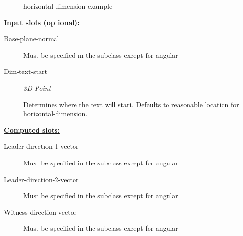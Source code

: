 \documentclass [11pt]{book}
\begin{document}
\begin{itemize}
\begin{figure}
\caption{horizontal-dimension example}

\label{fig:horizontal-dimension}

\end{figure}





\textbf{
\underline{Input slots (optional):}}

\begin{description}

\item [Base-plane-normal]

Must be specified in the subclass except for angular




\item [Dim-text-start]
\emph{3D Point}

 Determines where the text will start. Defaults to reasonable location for
horizontal-dimension.




\end{description}






\textbf{
\underline{Computed slots:}}

\begin{description}

\item [Leader-direction-1-vector]

Must be specified in the subclass except for angular




\item [Leader-direction-2-vector]

Must be specified in the subclass except for angular




\item [Witness-direction-vector]

Must be specified in the subclass except for angular




\end{description}








\end{itemize}
\end{document}
